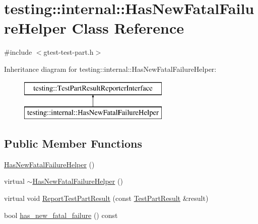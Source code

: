 \hypertarget{classtesting_1_1internal_1_1_has_new_fatal_failure_helper}{\section{testing\+:\+:internal\+:\+:Has\+New\+Fatal\+Failure\+Helper Class Reference}
\label{classtesting_1_1internal_1_1_has_new_fatal_failure_helper}
}


{\ttfamily \#include $<$gtest-\/test-\/part.\+h$>$}

Inheritance diagram for testing\+:\+:internal\+:\+:Has\+New\+Fatal\+Failure\+Helper\+:\begin{figure}[H]
\begin{center}
\leavevmode
\includegraphics[height=2.000000cm]{classtesting_1_1internal_1_1_has_new_fatal_failure_helper}
\end{center}
\end{figure}
\subsection*{Public Member Functions}
\begin{DoxyCompactItemize}
\item 
\hyperlink{classtesting_1_1internal_1_1_has_new_fatal_failure_helper_a59190a7188db558c00b4c6bf9251859a}{Has\+New\+Fatal\+Failure\+Helper} ()
\item 
virtual \hyperlink{classtesting_1_1internal_1_1_has_new_fatal_failure_helper_ae9207df58c9ca17b8243b6b664b402fa}{$\sim$\+Has\+New\+Fatal\+Failure\+Helper} ()
\item 
virtual void \hyperlink{classtesting_1_1internal_1_1_has_new_fatal_failure_helper_ac7b5e77c9847b2b057cb97193ba82441}{Report\+Test\+Part\+Result} (const \hyperlink{classtesting_1_1_test_part_result}{Test\+Part\+Result} \&result)
\item 
bool \hyperlink{classtesting_1_1internal_1_1_has_new_fatal_failure_helper_ae137e639098071f11f531bbd72dde1c7}{has\+\_\+new\+\_\+fatal\+\_\+failure} () const 
\end{DoxyCompactItemize}


